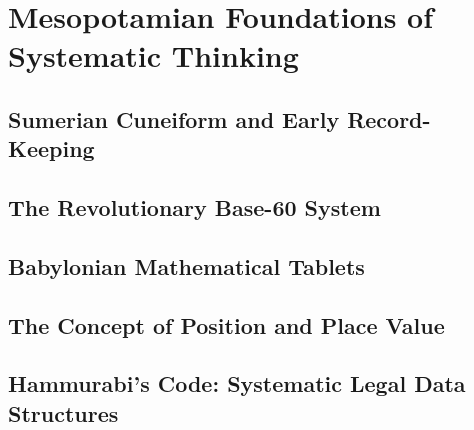 
\chapter{Mesopotamian Foundations of Systematic Thinking}

\section{Sumerian Cuneiform and Early Record-Keeping}

\section{The Revolutionary Base-60 System}

\section{Babylonian Mathematical Tablets}

\section{The Concept of Position and Place Value}

\section{Hammurabi's Code: Systematic Legal Data Structures}
